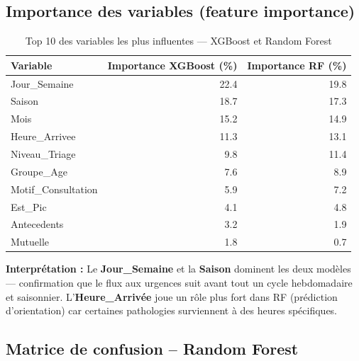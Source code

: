 \documentclass[12pt,a4paper]{report}
\begin{document}
	\subsection{Importance des variables (feature importance)}
	
	\begin{table}[H]
		\centering
		\caption{Top 10 des variables les plus influentes — XGBoost et Random Forest}
		\renewcommand{\arraystretch}{1.2}
		\begin{tabular}{lrr}
			\toprule
			\textbf{Variable} & \textbf{Importance XGBoost (\%)} & \textbf{Importance RF (\%)} \\
			\midrule
			Jour\_Semaine     & 22.4 & 19.8 \\
			Saison            & 18.7 & 17.3 \\
			Mois              & 15.2 & 14.9 \\
			Heure\_Arrivee   & 11.3 & 13.1 \\
			Niveau\_Triage    & 9.8  & 11.4 \\
			Groupe\_Age       & 7.6  & 8.9  \\
			Motif\_Consultation & 5.9 & 7.2 \\
			Est\_Pic          & 4.1  & 4.8  \\
			Antecedents       & 3.2  & 1.9  \\
			Mutuelle          & 1.8  & 0.7  \\
			\bottomrule
		\end{tabular}
	\end{table}
	
	\begin{infobox}
		\textbf{Interprétation :} Le \textbf{Jour\_Semaine} et la \textbf{Saison} dominent
		les deux modèles — confirmation que le flux aux urgences suit avant tout un cycle
		hebdomadaire et saisonnier. L'\textbf{Heure\_Arrivée} joue un rôle plus fort dans RF
		(prédiction d'orientation) car certaines pathologies surviennent à des heures spécifiques.
	\end{infobox}
	
	\subsection{Matrice de confusion -- Random Forest}
	
\end{document}
